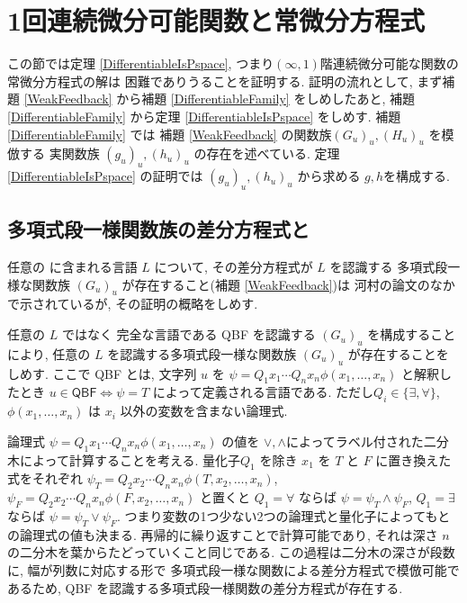 \section{1回連続微分可能関数と常微分方程式}
\label{section:differentiable}

この節では定理 \ref{DifferentiableIsPspace},
つまり$(\infty, 1)$階連続微分可能な関数の常微分方程式の解は
\PSPACE 困難でありうることを証明する.
証明の流れとして, まず補題 \ref{WeakFeedback} から補題 \ref{DifferentiableFamily} をしめしたあと,
補題 \ref{DifferentiableFamily} から定理 \ref{DifferentiableIsPspace} をしめす.
補題 \ref{DifferentiableFamily} では
補題 \ref{WeakFeedback} の関数族$(G_u)_u, (H_u)_u$ を模倣する
実関数族 $(g_u)_u, (h_u)_u$ の存在を述べている.
定理 \ref{DifferentiableIsPspace} の証明では
$(g_u)_u, (h_u)_u$ から求める $g, h$を構成する.



\subsection{多項式段一様関数族の差分方程式と\PSPACE}


任意の \PSPACE に含まれる言語 $L$ について, 
その差分方程式が $L$ を認識する
多項式段一様な関数族 $(G_u)_u$ が存在すること(補題 \ref{WeakFeedback})は
河村の論文のなかで示されているが, その証明の概略をしめす.

任意の $L$ ではなく \PSPACE 完全な言語である
\textsf{QBF} を認識する $(G_u)_u$ を構成することにより,
任意の $L$ を認識する多項式段一様な関数族 $(G_u)_u$ が存在することをしめす.
ここで \textsf{QBF} とは,
文字列 $u$ を $\psi = Q_1 x_1 \cdots Q_n x_n \phi(x_1, \dots, x_n)$ と解釈したとき 
$u \in \textsf{QBF} \Leftrightarrow \psi = T$ によって定義される言語である. 
ただし$Q_i \in \{\exists, \forall\}$,  $\phi(x_1, \dots, x_n)$ は $x_i$ 以外の変数を含まない論理式. 

論理式 $\psi = Q_1 x_1 \cdots Q_n x_n \phi(x_1, \dots, x_n)$ の値を
$\vee, \wedge$によってラベル付された二分木によって計算することを考える. 
量化子$Q_1$ を除き $x_1$ を $T$ と $F$ に置き換えた式をそれぞれ
$\psi_T = Q_2 x_2 \cdots Q_n x_n \phi(T, x_2, \dots, x_n)$,
$\psi_F = Q_2 x_2 \cdots Q_n x_n \phi(F, x_2, \dots, x_n)$ と置くと
$Q_1=\forall$ ならば $\psi = \psi_T \wedge \psi_F$, 
$Q_1=\exists$ ならば $\psi = \psi_T \vee \psi_F$.
つまり変数の1つ少ない2つの論理式と量化子によってもとの論理式の値も決まる.
再帰的に繰り返すことで計算可能であり,
それは深さ $n$ の二分木を葉からたどっていくこと同じである.
この過程は二分木の深さが段数に, 幅が列数に対応する形で
多項式段一様な関数による差分方程式で模倣可能であるため,
\textsf{QBF} を認識する多項式段一様関数の差分方程式が存在する.


